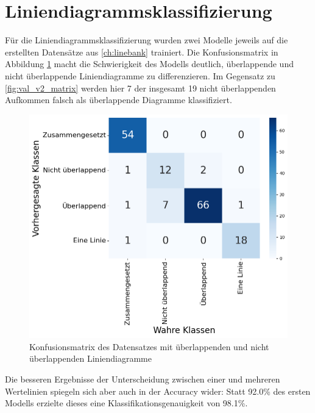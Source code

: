 \section{Liniendiagrammsklassifizierung}
\label{ch:classify_eval}

Für die Liniendiagrammsklassifizierung wurden zwei Modelle jeweils auf die erstellten Datensätze aus \ref{ch:linebank} trainiert. Die Konfusionsmatrix in Abbildung \ref{fig:val_v1_matrix} macht die Schwierigkeit des Modells deutlich, überlappende und nicht überlappende Liniendiagramme zu differenzieren. Im Gegensatz zu \ref{fig:val_v2_matrix} werden hier 7 der insgesamt 19 nicht überlappenden Aufkommen falsch als überlappende Diagramme klassifiziert.

\begin{figure}[H]
    \centering
    \captionsetup{width=.75\linewidth}
    \includegraphics[width=.75\textwidth]{Experimente/img/classify/val_v1/matrix.png}
    \caption{ Konfusionsmatrix des Datensatzes mit überlappenden und nicht überlappenden Liniendiagramme}
    \label{fig:val_v1_matrix}
\end{figure}

Die besseren Ergebnisse der Unterscheidung zwischen einer und mehreren Wertelinien spiegeln sich aber auch in der Accuracy wider: Statt 92.0\% des ersten Modells erzielte dieses eine Klassifikationsgenauigkeit von 98.1\%.

